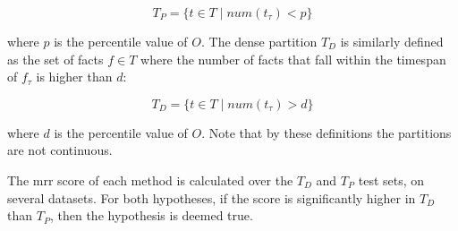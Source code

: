 
\begin{equation}
T_P = \{ t \in T \mid \textit{num}(t_\tau) < p \}
\end{equation}

\noindent
where $p$ is the  percentile value of $O$. The dense partition $T_D$ is similarly defined as the set of facts $f \in T$ where the number of facts that fall within the timespan of $f_\tau$ is higher than $d$:


\begin{equation}
T_D = \{ t \in T \mid \textit{num}(t_\tau) > d \}
\end{equation}

\noindent
where $d$ is the  percentile value of $O$. Note that by these definitions the partitions are not continuous.

The \gls{mrr} score of each method is calculated over the $T_D$ and $T_P$ test sets, on several datasets. For both hypotheses, if the score is significantly higher in $T_D$ than $T_P$, then the hypothesis is deemed true.

\begin{comment}
foreach fact in dataset
    fact_count_i_timespan(fact) >> array
done
sort(array)
median(array)
\end{comment}